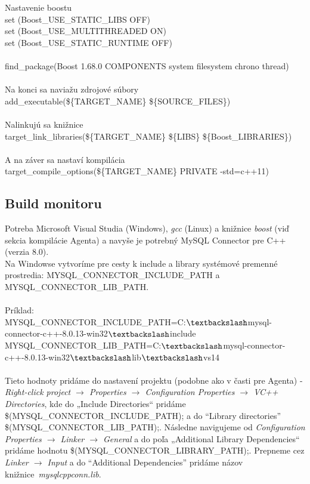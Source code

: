 \documentclass[a4paper,12pt]{article}
\begin{document}
Nastavenie boostu  \\
set (Boost\_USE\_STATIC\_LIBS OFF) \\
set (Boost\_USE\_MULTITHREADED ON) \\
set (Boost\_USE\_STATIC\_RUNTIME OFF) \\ \\
find\_package(Boost 1.68.0 COMPONENTS system filesystem chrono thread) \\ \\
Na konci sa naviažu zdrojové súbory \\
add\_executable(\$\{TARGET\_NAME\} \$\{SOURCE\_FILES\}) \\ \\
Nalinkujú sa knižnice  \\
target\_link\_libraries(\$\{TARGET\_NAME\} \$\{LIBS\} \$\{Boost\_LIBRARIES\}) \\ \\
A na záver sa nastaví kompilácia \\
target\_compile\_options(\$\{TARGET\_NAME\} PRIVATE -std=c++11) \\

\subsection{Build monitoru}
Potreba Microsoft Visual Studia (Windows), \textit{gcc} (Linux) a knižnice \textit{boost} (viď sekcia kompilácie Agenta) a navyše je potrebný MySQL Connector pre C++ (verzia 8.0). \\

Na Windowse vytvoríme pre cesty k include a library systémové premenné prostredia: MYSQL\_CONNECTOR\_INCLUDE\_PATH a MYSQL\_CONNECTOR\_LIB\_PATH. \\ \\
Príklad: \\
MYSQL\_CONNECTOR\_INCLUDE\_PATH=C:$\textbackslash$mysql-connector-c++-8.0.13-win32$\textbackslash$include \\
MYSQL\_CONNECTOR\_LIB\_PATH=C:$\textbackslash$mysql-connector-c++-8.0.13-win32$\textbackslash$lib$\textbackslash$vs14 \\ \\

Tieto hodnoty pridáme do nastavení projektu (podobne ako v časti pre Agenta) - \textit{Right-click project $\rightarrow$ Properties $\rightarrow$ Configuration Properties $\rightarrow$ VC++ Directories}, kde do „Include Directories“ pridáme \$(MYSQL\_CONNECTOR\_INCLUDE\_PATH); a do “Library directories” \$(MYSQL\_CONNECTOR\_LIB\_PATH);. Následne navigujeme od \textit{Configuration Properties $\rightarrow$ Linker $\rightarrow$ General} a do poľa „Additional Library Dependencies“ pridáme hodnotu \$(MYSQL\_CONNECTOR\_LIBRARY\_PATH);. Prepneme cez \textit{Linker $\rightarrow$ Input} a do “Additional Dependencies” pridáme názov knižnice~\textit{mysqlcppconn.lib}. \\ 
\end{document}
